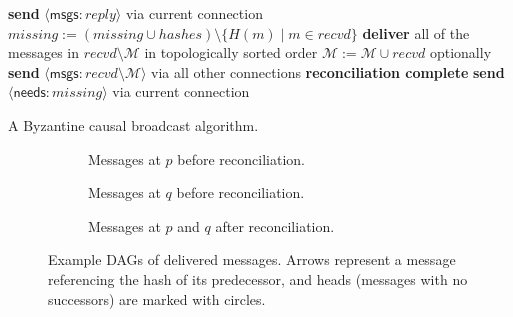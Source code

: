 \documentclass[a4paper,anonymous,USenglish]{lipics-v2019}
\begin{document}
\begin{algorithm}
\begin{algorithmic}[1]
        \State \textbf{send} $\langle\mathsf{msgs}: \mathit{reply}\rangle$ via current connection \label{line:send-msgs}
    \EndOn\label{line:end-needs}
    \State
        \State $\mathit{missing} := (\mathit{missing} \cup \mathit{hashes}) \setminus \{H(m) \mid m \in \mathit{recvd}\}$
         \label{line:missing-empty}
            \State \textbf{deliver} all of the messages in $\mathit{recvd} \setminus \mathcal{M}$ in topologically sorted order\label{line:deliver}
            \State $\mathcal{M} := \mathcal{M} \cup \mathit{recvd}$ \label{line:update-m}
            \State optionally \textbf{send} $\langle\mathsf{msgs}: \mathit{recvd} \setminus \mathcal{M}\rangle$ via all other connections\label{line:eager-relay}
            \State \textbf{reconciliation complete} \label{line:finish}
        \Else
            \State \textbf{send} $\langle\mathsf{needs}: \mathit{missing}\rangle$ via current connection \label{line:send-missing}
        \EndIf
    \EndFunction
    \end{algorithmic}
    \caption{A Byzantine causal broadcast algorithm.}\label{fig:algorithm}
\end{algorithm}

\begin{figure}
    \centering
    \begin{subfigure}[b]{0.35\textwidth}
    \centering
    \hspace{0.5cm}
    \captionsetup{width=.9\linewidth}
    \caption{Messages at $p$ before reconciliation.}
    \end{subfigure}%
    \begin{subfigure}[b]{0.26\textwidth}
    \centering
    \hspace{0.5cm}
    \captionsetup{width=.9\linewidth}
    \caption{Messages at $q$ before reconciliation.}
    \end{subfigure}%
    \begin{subfigure}[b]{0.35\textwidth}
    \centering
    
    \captionsetup{width=.9\linewidth}
    \caption{Messages at $p$ and $q$ after reconciliation.}
    \end{subfigure}
    \caption{Example DAGs of delivered messages. Arrows represent a message referencing the hash of its predecessor, and heads (messages with no successors) are marked with circles.}
    \label{fig:example-dags}
\end{figure}
\end{document}

